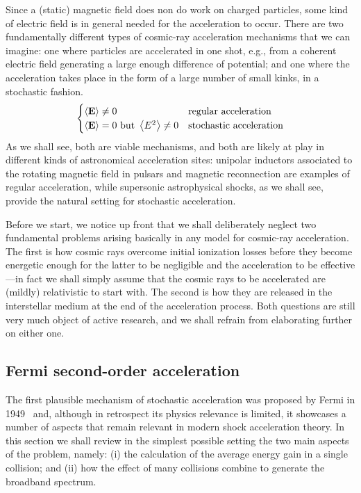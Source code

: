 Since a (static) magnetic field does non do work on charged particles, some kind of
electric field is in general needed for the acceleration to occur. There are two
fundamentally different types of cosmic-ray acceleration mechanisms that we can
imagine: one where particles are accelerated in one shot, e.g., from a coherent
electric field generating a large enough difference of potential; and one where
the acceleration takes place in the form of a large number of small kinks, in a
stochastic fashion.
\begin{align*}
  \begin{cases}
    \left<\vb{E}\right> \neq 0 & \text{regular acceleration}\\
  \left<\vb{E}\right> = 0~\text{but}~\left<E^2\right> \neq 0 & \text{stochastic acceleration}
  \end{cases}
\end{align*}
As we shall see, both are viable mechanisms, and both are likely at play in different
kinds of astronomical acceleration sites: unipolar inductors associated to the
rotating magnetic field in pulsars and magnetic reconnection are examples of regular
acceleration, while supersonic astrophysical shocks, as we shall
see, provide the natural setting for stochastic acceleration.

Before we start, we notice up front that we shall deliberately neglect two fundamental
problems arising basically in any model for cosmic-ray acceleration. The first is
how cosmic rays overcome initial ionization losses before they become energetic
enough for the latter to be negligible and the acceleration to be effective---in
fact we shall simply assume that the cosmic rays to be accelerated are (mildly)
relativistic to start with. The second is how they are released in the interstellar
medium at the end of the acceleration process. Both questions are still very much
object of active research, and we shall refrain from elaborating further on either one.



\subsection{Fermi second-order acceleration}

The first plausible mechanism of stochastic acceleration was proposed by Fermi in
1949~\cite{1949PhRv...75.1169F} and, although in retrospect its physics relevance
is limited, it showcases a number of aspects that remain relevant in modern shock
acceleration theory. In this section we shall review in the simplest possible setting
the two main aspects of the problem, namely: (i) the calculation of the average
energy gain in a single collision; and (ii) how the effect of many collisions combine
to generate the broadband spectrum.

